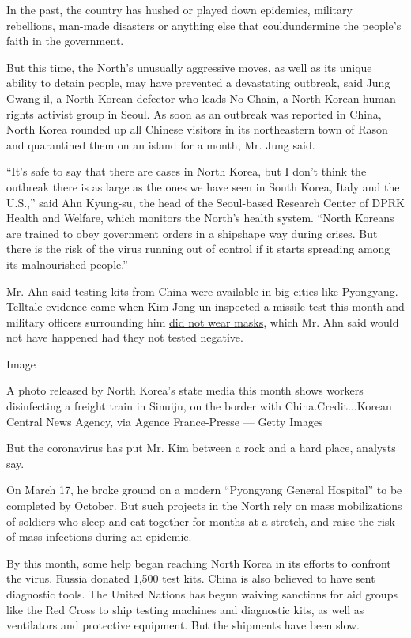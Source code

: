 In the past, the country has hushed or played down epidemics, military
rebellions, man-made disasters or anything else that could ​undermine
the people's faith in the government.

​But this time, the North's unusually aggressive moves​, as well as its
unique ability to detain people, may have prevented a devastating
outbreak​, said Jung Gwang-il, a North Korean defector who leads No
Chain, a North Korean human rights activist group in Seoul​. As soon as
an outbreak was ​reported in China, North Korea rounded up ​all ​Chinese
visitors in its northeastern town of Rason ​and quarantine​d​ them ​on
an island for a month, Mr. Jung said.

``It's safe to say that there are cases in North Korea, but I don't
think the outbreak there is as large as the ones we have seen in South
Korea, Italy and the U.S.,'' said Ahn Kyung-su, the head of the
Seoul-based Research Center of DPRK Health and Welfare, which monitors
the North's health system. ``North Koreans are trained to obey
government orders in a shipshape way during crises. But there is the
risk of the virus running out of control if it starts spreading among
its malnourished people.''

Mr. Ahn said testing kits from China were available in big cities like
Pyongyang. Telltale evidence came when Kim Jong-un inspected a missile
test this month and military officers surrounding him
\href{https://news.joins.com/article/23736429}{did not wear masks},
which Mr. Ahn said would not have happened had they not tested negative.

Image

A photo released by North Korea's state media this month shows workers
disinfecting a freight train in Sinuiju, on the border with
China.Credit...Korean Central News Agency, via Agence France-Presse ---
Getty Images

But the coronavirus has put Mr. Kim between a rock and a hard place,
analysts say.

On March 17, ​he broke ground on a modern ​``Pyongyang General
Hospital​'' to be completed by October. But such projects in the North
rely​ on mass mobilization​s​ of soldiers who ​sleep and eat together
for months at a stretch​, and raise the risk of mass infections during
an epidemic.

​By this month, some help began reaching North Korea in its efforts to
confront the virus. Russia donated 1,500 test kits​​. China is also
believed to have sent diagnostic tools​. The United Nations has
​​​​begun waiving sanctions for aid groups like​ the Red Cross to ship
testing machines and diagnostic kits, as well as ventilators and
protective equipment. But the shipments have been slow.

